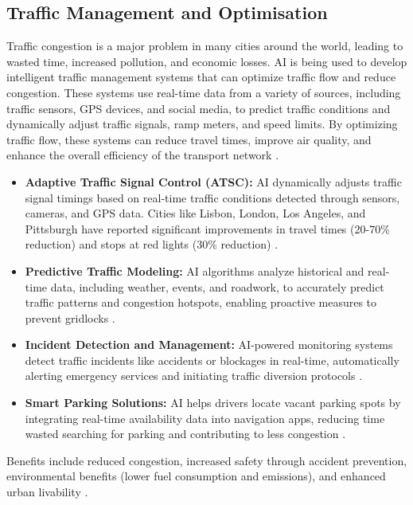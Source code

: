 \subsection{Traffic Management and Optimisation}
Traffic congestion is a major problem in many cities around the world, leading to wasted time, increased pollution, and economic losses. AI is being used to develop intelligent traffic management systems that can optimize traffic flow and reduce congestion. These systems use real-time data from a variety of sources, including traffic sensors, GPS devices, and social media, to predict traffic conditions and dynamically adjust traffic signals, ramp meters, and speed limits. By optimizing traffic flow, these systems can reduce travel times, improve air quality, and enhance the overall efficiency of the transport network \cite{abduljabbar2019applications}.
\begin{itemize}
    \item \textbf{Adaptive Traffic Signal Control (ATSC):} AI dynamically adjusts traffic signal timings based on real-time traffic conditions detected through sensors, cameras, and GPS data. Cities like Lisbon, London, Los Angeles, and Pittsburgh have reported significant improvements in travel times (20-70\% reduction) and stops at red lights (30\% reduction) \cite{Numalis_Traffic, Medium_Traffic}.
    \item \textbf{Predictive Traffic Modeling:} AI algorithms analyze historical and real-time data, including weather, events, and roadwork, to accurately predict traffic patterns and congestion hotspots, enabling proactive measures to prevent gridlocks \cite{Isarsoft_Traffic, Stellarix_Traffic}.
    \item \textbf{Incident Detection and Management:} AI-powered monitoring systems detect traffic incidents like accidents or blockages in real-time, automatically alerting emergency services and initiating traffic diversion protocols \cite{Binmile_Traffic, PublicWorksPartners_Traffic}.
    \item \textbf{Smart Parking Solutions:} AI helps drivers locate vacant parking spots by integrating real-time availability data into navigation apps, reducing time wasted searching for parking and contributing to less congestion \cite{Litslink_Traffic}.
\end{itemize}
Benefits include reduced congestion, increased safety through accident prevention, environmental benefits (lower fuel consumption and emissions), and enhanced urban livability \cite{Swarco_Traffic, SensorDynamics_Traffic}.

